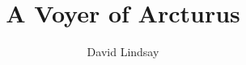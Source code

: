 \documentclass[11pt,cimage,bimage]{VictorianBook}
\begin{document}
\title{A Voyer of Arcturus}
\author{David Lindsay}
\maketitle
\frontmatter
\tableofcontents
\mainmatter
\pagestyle{fancy}
\color{gray!140}





\end{document}
